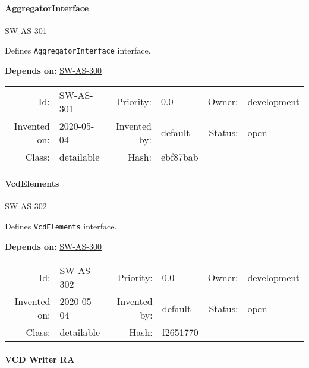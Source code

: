 \paragraph{AggregatorInterface}

\hypertarget{SW-AS-301}{SW-AS-301} 
\label{SW-AS-301}

Defines \texttt{AggregatorInterface} interface.







 \textbf{Depends on:}
 \hyperlink{SW-AS-300}{SW-AS-300} 




\par{\small \begin{center}
\begin{tabular}{rlrlrl}
   Id: & SW-AS-301               & Priority: & 0.0          & Owner: & development \\
   Invented on: & 2020-05-04 & Invented by: & default & Status: & open \\
   Class: & detailable & Hash: & ebf87bab
\end{tabular}\end{center}
}

\paragraph{VcdElements}

\hypertarget{SW-AS-302}{SW-AS-302} 
\label{SW-AS-302}

Defines \texttt{VcdElements} interface.







 \textbf{Depends on:}
 \hyperlink{SW-AS-300}{SW-AS-300} 




\par{\small \begin{center}
\begin{tabular}{rlrlrl}
   Id: & SW-AS-302               & Priority: & 0.0          & Owner: & development \\
   Invented on: & 2020-05-04 & Invented by: & default & Status: & open \\
   Class: & detailable & Hash: & f2651770
\end{tabular}\end{center}
}

\paragraph{VCD Writer RA}

